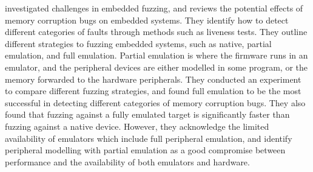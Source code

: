 \documentclass[../report.tex]{subfiles}
\begin{document}
\citet{Muench_2018} investigated challenges in embedded fuzzing, and reviews
the potential effects of memory corruption bugs on embedded systems.
They identify how to detect different categories of faults through methods such
as liveness tests. They outline different strategies to fuzzing embedded
systems, such as native, partial emulation, and full emulation. Partial
emulation is where the firmware runs in an emulator, and the peripheral devices
are either modelled in some program, or the memory forwarded to the hardware
peripherals. They conducted an experiment to compare different fuzzing
strategies, and found full emulation to be the most successful in detecting
different categories of memory corruption bugs. They also found that fuzzing
against a fully emulated target is significantly faster than fuzzing against a
native device. However, they acknowledge the limited availability of emulators
which include full peripheral emulation, and identify peripheral modelling with
partial emulation as a good compromise between performance and the availability
of both emulators and hardware.
\end{document}
